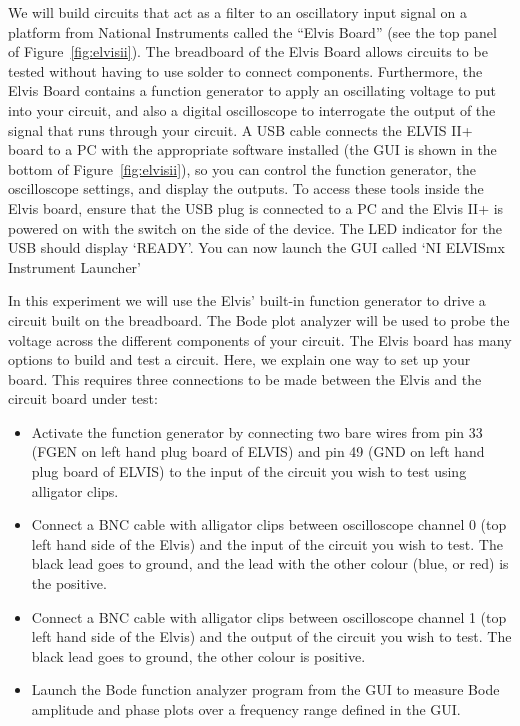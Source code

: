 \documentclass{article}
\begin{document}
We will build circuits that act as a filter to an oscillatory input
signal on a platform from National Instruments called the ``Elvis
Board'' (see the top panel of Figure~\ref{fig:elvisii}). The breadboard of
the Elvis Board allows circuits to be tested without having to use
solder to connect components. Furthermore, the Elvis Board contains a
function generator to apply an oscillating voltage to put into your
circuit, and also a digital oscilloscope to interrogate the output of
the signal that runs through your circuit. A USB cable connects the
ELVIS II+ board to a PC with the appropriate software installed (the
GUI is shown in the bottom of Figure~\ref{fig:elvisii}), so you can
control the function generator, the oscilloscope settings, and display
the outputs.  To access these tools inside the Elvis board, ensure
that the USB plug is connected to a PC and the Elvis II+ is powered on
with the switch on the side of the device. The LED indicator for the
USB should display `READY'. You can now launch the GUI called `NI ELVISmx
Instrument Launcher'

In this experiment we will use the Elvis' built-in function generator
to drive a circuit built on the breadboard. The Bode plot analyzer
will be used to probe the voltage across the different components of
your circuit. The Elvis board has many options to build and test a
circuit. Here, we explain one way to set up your board. This requires
three connections to be made between the Elvis and the circuit board
under test:
\begin{itemize}
\item Activate the function generator by connecting two bare wires
  from pin 33 (FGEN on left hand plug board of ELVIS) and pin 49 (GND
  on left hand plug board of ELVIS) to the input of the circuit you
  wish to test using alligator clips.
\item Connect a BNC cable with alligator clips between oscilloscope
  channel 0 (top left hand side of the Elvis) and the input of the
  circuit you wish to test. The black lead goes to ground, and the lead with the
  other colour (blue, or red) is the positive.
\item Connect a BNC cable with alligator clips between
  oscilloscope channel 1 (top left hand side of the Elvis) and the
  output of the circuit you wish to test. The black lead goes to
  ground, the other colour is positive.
\item Launch the Bode function analyzer program from the GUI to
  measure Bode amplitude and phase plots over a frequency
  range defined in the GUI.
\end{itemize}
\end{document}
